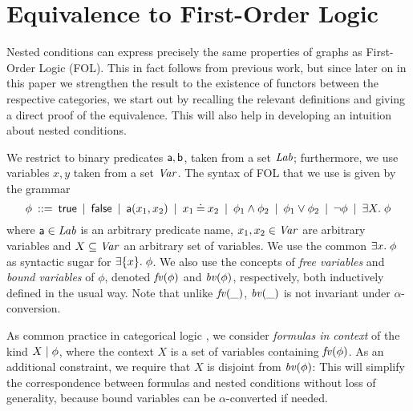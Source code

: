 \section{Equivalence to First-Order Logic}

Nested conditions can express precisely the same properties of graphs as First-Order Logic (FOL). This in fact follows from previous work, but since later on in this paper we strengthen the result to the existence of functors between the respective categories, we start out by recalling the relevant definitions and giving a direct proof of the equivalence. This will also help in developing an intuition about nested conditions.

We restrict to binary predicates $\mathsf{a},\mathsf{b}$, taken from a set $\mathit{Lab}$; furthermore, we use variables $x,y$ taken from a set $\mathit{Var}$. The syntax of FOL that we use is given by the grammar
%
\[ \phi \:::=\: \mathsf{true}
        \:\mid\: \mathsf{false}
		\:\mid\: \mathsf{a}(x_1,x_2)
        \:\mid\: x_1\mathbin{\doteq} x_2
		\:\mid\: \phi_1\wedge \phi_2
		\:\mid\: \phi_1\vee \phi_2
		\:\mid\: \neg\phi
		\:\mid\: \exists X.\; \phi 
		\]
where $\mathsf{a}\in\mathit{Lab}$ is an arbitrary predicate name, $x_1,x_2\in\mathit{Var}$ are arbitrary variables and $X\subseteq \mathit{Var}$ an arbitrary set of variables. We use the common $\exists x.\; \phi$ as syntactic sugar for $\exists\{{x}\}.\; \phi$. We also use the concepts of \emph{free variables} and \emph{bound variables} of $\phi$, denoted $\mathit{fv}(\phi)$ and $\mathit{bv}(\phi)$, respectively, both inductively defined in the usual way. Note that unlike $\mathit{fv}(\_)$, $\mathit{bv}(\_)$ is not invariant under $\alpha$-conversion.

As common practice in categorical logic \cite{JacobsBook}, we consider \emph{formulas in context} of the kind ${X} \mid {\phi}$, where the context $X$ is a set of variables containing $\mathit{fv}(\phi)$. As an additional constraint, we require that $X$ is disjoint from $\mathit{bv}(\phi)$: This will simplify the correspondence between formulas and nested conditions without loss of generality, because bound variables can be $\alpha$-converted if needed.

